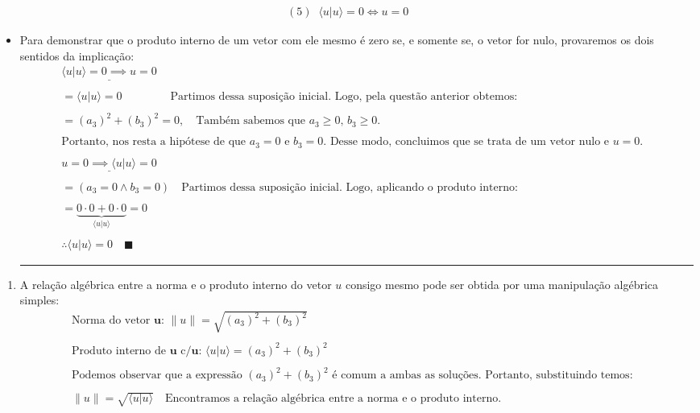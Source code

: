 \documentclass[
]{article}
\providecommand{\tightlist}{%
  \setlength{\itemsep}{0pt}\setlength{\parskip}{0pt}}
\begin{document}
\begin{itemize}
  \[
  \begin{flalign*}
  (5)\;\;\langle u|u\rangle=0\iff u=0&&
  \end{flalign*}
  \]
\item
  Para demonstrar que o produto interno de um vetor com ele mesmo é zero
  se, e somente se, o vetor for nulo, provaremos os dois sentidos da
  implicação: \[
  \begin{flalign*}
  &\underline{\langle u|u\rangle=0\implies u=0}&& \\ \\
  &=\langle u|u\rangle=0\qquad\qquad\;\text{Partimos dessa suposição inicial. Logo, pela questão anterior obtemos:}&& \\ \\
  &=(a_3)^2+(b_3)^2=0,\quad\text{Também sabemos que }a_3\geq0,\,b_3\geq0.&& \\ \\
  &\text{Portanto, nos resta a hipótese de que $a_3=0$ e $b_3=0$. Desse modo, concluimos que se trata de um vetor nulo e $u=0$.}&& \\ \\
  &\underline{u=0\implies\langle u|u\rangle=0}&& \\ \\
  &=(a_3=0\wedge b_3=0)\quad\text{Partimos dessa suposição inicial. Logo, aplicando o produto interno:}&& \\ \\
  &=\underbrace{0\cdot0+0\cdot0}_{\langle u|u\rangle}=0&& \\ \\
  &\therefore\langle u|u\rangle=0\quad\blacksquare
  \end{flalign*}
  \]

  \begin{center}\rule{0.5\linewidth}{0.5pt}\end{center}
\end{itemize}

\begin{enumerate}
\def\labelenumi{\arabic{enumi}.}
\setcounter{enumi}{1}
\tightlist
\item
  A relação algébrica entre a norma e o produto interno do vetor \(u\)
  consigo mesmo pode ser obtida por uma manipulação algébrica simples:\[
  \begin{flalign*}
  &\text{Norma do vetor }\mathbf u:\,\|u\|=\sqrt{(a_3)^2+(b_3)^2}&& \\ \\
  &\text{Produto interno de }\mathbf u\text{ c/}\mathbf u:\,\langle u|u\rangle=(a_3)^2+(b_3)^2&& \\ \\
  &\text{Podemos observar que a expressão }(a_3)^2+(b_3)^2\text{ é comum a ambas as soluções. Portanto, substituindo temos:}&& \\ \\
  &\boxed{\|u\|=\sqrt{\langle u|u\rangle}}\quad\text{Encontramos a relação algébrica entre a norma e o produto interno.}&& \\ \\
  \end{flalign*}
  \]
\end{enumerate}
\end{document}
